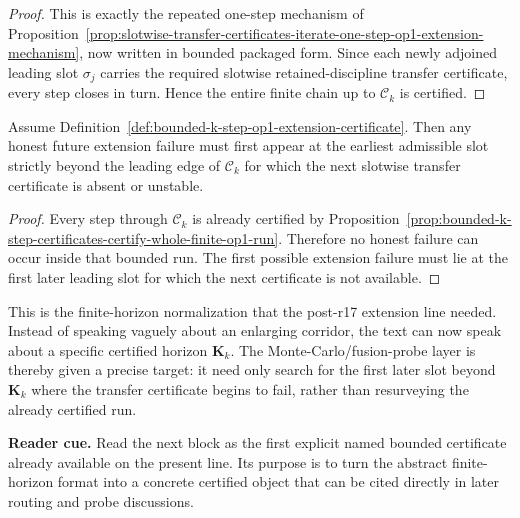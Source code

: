 \begin{proof}
This is exactly the repeated one-step mechanism of Proposition~\ref{prop:slotwise-transfer-certificates-iterate-one-step-op1-extension-mechanism}, now written in bounded packaged form. Since each newly adjoined leading slot $\sigma_j$ carries the required slotwise retained-discipline transfer certificate, every step closes in turn. Hence the entire finite chain up to $\mathcal C_k$ is certified.
\end{proof}

\begin{corollary}
\label{cor:first-honest-failure-lies-beyond-bounded-certificate-horizon}
Assume Definition~\ref{def:bounded-k-step-op1-extension-certificate}. Then any honest future extension failure must first appear at the earliest admissible slot strictly beyond the leading edge of $\mathcal C_k$ for which the next slotwise transfer certificate is absent or unstable.
\end{corollary}

\begin{proof}
Every step through $\mathcal C_k$ is already certified by Proposition~\ref{prop:bounded-k-step-certificates-certify-whole-finite-op1-run}. Therefore no honest failure can occur inside that bounded run. The first possible extension failure must lie at the first later leading slot for which the next certificate is not available.
\end{proof}

\begin{remark}
\label{rem:what-bounded-certificate-format-now-buys}
This is the finite-horizon normalization that the post-r17 extension line needed. Instead of speaking vaguely about an enlarging corridor, the text can now speak about a specific certified horizon $\mathbf K_k$. The Monte-Carlo/fusion-probe layer is thereby given a precise target: it need only search for the first later slot beyond $\mathbf K_k$ where the transfer certificate begins to fail, rather than resurveying the already certified run.
\end{remark}


\noindent\textbf{Reader cue.} Read the next block as the first explicit named bounded certificate already available on the present line. Its purpose is to turn the abstract finite-horizon format into a concrete certified object that can be cited directly in later routing and probe discussions.

